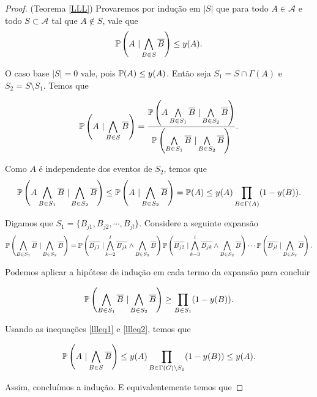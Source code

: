 \begin{proof}{(Teorema \ref{LLL})}
Provaremos por indução em $|S|$ que para todo $A \in \mathcal{A}$ e todo $S \subset \mathcal{A}$ tal que $A\not\in S$, vale que \[\bbp\left(A\ |\bigwedge\limits_{B\in S} \overline{B}\right) \leq y(A).\]

O caso base $|S| = 0$ vale, pois $\mathbb{P}(A) \leq y(A)$. Então seja $S_1 = S \cap \Gamma(A)$ e $S_2 = S\setminus S_1$. Temos que

\[\mathbb{P}\left(A\ |\bigwedge\limits_{B\in S}\overline{B}\right) = \frac{\mathbb{P}\left(A \bigwedge\limits_{B \in S_1} \overline{B}\ | \bigwedge\limits_{B \in S_2} \overline{B}\right)}{\mathbb{P}\left(\bigwedge\limits_{B \in S_1} \overline{B}\ | \bigwedge\limits_{B \in S_2} \overline{B}\right)}.\]

Como $A$ é independente dos eventos de $S_2$, temos que
\begin{equation}\label{llleq1}
\mathbb{P}\left(A \bigwedge\limits_{B \in S_1} \overline{B}\ | \bigwedge\limits_{B \in S_2} \overline{B}\right) \leq \mathbb{P}\left(A\ | \bigwedge\limits_{B \in S_2} \overline{B}\right) = \mathbb{P}(A) \leq y(A)\prod_{B\in \Gamma(A)}(1-y(B)).
\end{equation}

Digamos que $S_1 = \{B_{j1}, B_{j2}, \cdots, B_{jl}\}$. Considere a seguinte expansão
\[\mathbb{P}\left(\bigwedge\limits_{B \in S_1} \overline{B}\ | \bigwedge\limits_{B \in S_2} \overline{B}\right) = \mathbb{P}\left( \overline{B_{j1}}\ | \bigwedge\limits_{k=2}^l \overline{B_{jk}} \wedge \bigwedge\limits_{B \in S_2} \overline{B}\right) \mathbb{P}\left( \overline{B_{j2}}\ | \bigwedge\limits_{k=3}^l \overline{B_{jk}} \wedge \bigwedge\limits_{B \in S_2} \overline{B} \right) \cdots \mathbb{P}\left(\overline{B_{jl}}\ | \bigwedge\limits_{B \in S_2} \overline{B}\right).\]

Podemos aplicar a hipótese de indução em cada termo da expansão para concluir

\begin{equation}\label{llleq2}
\mathbb{P}\left(\bigwedge\limits_{B \in S_1} \overline{B}\ | \bigwedge\limits_{B \in S_2} \overline{B}\right) \geq \prod_{B \in S_1} (1 - y(B)).
\end{equation}

Usando as inequações \ref{llleq1} e \ref{llleq2}, temos que

\[\mathbb{P}\left(A\ |\bigwedge\limits_{B\in S}\overline{B}\right) \leq y(A) \prod_{B\in \Gamma(G)\setminus S_1}(1 - y(B)) \leq y(A).\]

Assim, concluímos a indução. E equivalentemente temos que


\end{proof}
